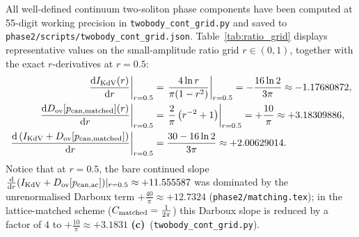 \documentclass[11pt,a4paper]{article}
\newcommand{\Lc}{\textbf{(c)}}
\newcommand{\script}[1]{\texttt{#1}}
\newcommand{\dd}{\mathrm{d}}
\begin{document}
All well-defined continuum two-soliton phase components have been computed at 55-digit working precision in \script{twobody\_cont\_grid.py} and saved to \script{phase2/scripts/twobody\_cont\_grid.json}. Table~\ref{tab:ratio_grid} displays representative values on the small-amplitude ratio grid $r\in(0,1)$, together with the exact $r$-derivatives at $r=0.5$:
\begin{equation}\label{eq:r05_derivs}
\begin{aligned}
\left.\frac{\dd I_{\rm KdV}(r)}{\dd r}\right|_{r=0.5}&=\left.\frac{4\ln r}{\pi(1-r^2)}\right|_{r=0.5}=-\frac{16\ln 2}{3\pi}\approx -1.17680872,\\
\left.\frac{\dd D_{\rm ov}[p_{\rm can,matched}](r)}{\dd r}\right|_{r=0.5}&=\left.\frac{2}{\pi}\left(r^{-2}+1\right)\right|_{r=0.5}=+\frac{10}{\pi}\approx +3.18309886,\\
\left.\frac{\dd\left(I_{\rm KdV}+D_{\rm ov}[p_{\rm can,matched}]\right)}{\dd r}\right|_{r=0.5}&=\frac{30-16\ln 2}{3\pi}\approx +2.00629014.
\end{aligned}
\end{equation}
Notice that at $r=0.5$, the bare continued slope $\frac{\dd}{\dd r}(I_{\rm KdV}+D_{\rm ov}[p_{\rm can,ac}])|_{r=0.5}\approx +11.555587$ was dominated by the unrenormalised Darboux term $+\frac{40}{\pi}\approx +12.7324$ (\texttt{phase2/matching.tex}); in the lattice-matched scheme ($C_{\rm matched}=\frac{1}{2\pi}$) this Darboux slope is reduced by a factor of $4$ to $+\frac{10}{\pi}\approx +3.1831$ \Lc\ (\script{twobody\_cont\_grid.py}).
\end{document}
